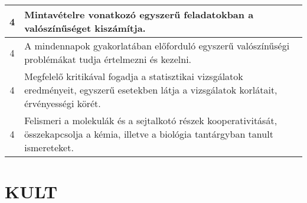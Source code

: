 \begin{longtable}{c | p{12cm} }
                                          4 &  Mintavételre vonatkozó egyszerű feladatokban a valószínűséget kiszámítja. \\ \hline
                                          4 &  A mindennapok gyakorlatában előforduló egyszerű valószínűségi problémákat tudja értelmezni és kezelni. \\ \hline
                                          4 &  Megfelelő kritikával fogadja a statisztikai vizsgálatok eredményeit, egyszerű esetekben látja a vizsgálatok korlátait, érvényességi körét. \\ \hline
                                          4 &  Felismeri a molekulák és a sejtalkotó részek kooperativitását, összekapcsolja  a kémia, illetve a biológia tantárgyban tanult ismereteket. \\ \hline
                                      
                        \end{longtable}
            \clearpage

        \section{KULT}


